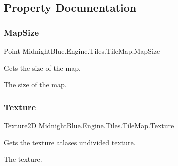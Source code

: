 \subsection{Property Documentation}
\hypertarget{class_midnight_blue_1_1_engine_1_1_tiles_1_1_tile_map_ac67e4df079e26f5383bc970f77a9ab3d}{}\label{class_midnight_blue_1_1_engine_1_1_tiles_1_1_tile_map_ac67e4df079e26f5383bc970f77a9ab3d} 
\subsubsection{\texorpdfstring{Map\+Size}{MapSize}}
{\footnotesize\ttfamily Point Midnight\+Blue.\+Engine.\+Tiles.\+Tile\+Map.\+Map\+Size\hspace{0.3cm}{\ttfamily [get]}}



Gets the size of the map. 

The size of the map.\hypertarget{class_midnight_blue_1_1_engine_1_1_tiles_1_1_tile_map_a2cac83aafbdbffe76d092adc29a32f60}{}\label{class_midnight_blue_1_1_engine_1_1_tiles_1_1_tile_map_a2cac83aafbdbffe76d092adc29a32f60} 
\subsubsection{\texorpdfstring{Texture}{Texture}}
{\footnotesize\ttfamily Texture2D Midnight\+Blue.\+Engine.\+Tiles.\+Tile\+Map.\+Texture\hspace{0.3cm}{\ttfamily [get]}}



Gets the texture atlases undivided texture. 

The texture.\hypertarget{class_midnight_blue_1_1_engine_1_1_tiles_1_1_tile_map_aaa31f70007fee9ded9c727d2eceda1b5}{}\label{class_midnight_blue_1_1_engine_1_1_tiles_1_1_tile_map_aaa31f70007fee9ded9c727d2eceda1b5} 
